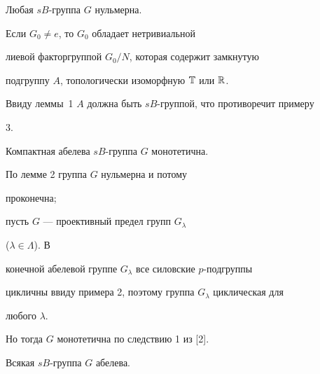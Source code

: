  


\begin{lem} 


Любая $sB$-группа $G$ нульмерна. 


\end{lem} 


 


\begin{pf} 


Если $G_0\ne e$, то $G_0$ обладает нетривиальной 


лиевой факторгруппой $G_0/N$, которая содержит замкнутую 


подгруппу $A$, топологически изоморфную $\Bbb T$ или $\Bbb R$.  


Ввиду леммы~1\; $A$ должна быть $sB$-группой, что противоречит примеру 


3. 


\end{pf} 


 


\begin{lem} 


Компактная абелева $sB$-группа $G$ монотетична. 


\end{lem} 


 


\begin{pf} По лемме 2 группа $G$ нульмерна и потому 


проконечна; 


пусть $G$ --- проективный предел групп $G_\lambda$ 


($\lambda\in\Lambda$). В 


конечной абелевой группе $G_\lambda$ все силовские $p$-подгруппы 


цикличны ввиду примера 2, поэтому группа $G_\lambda$ циклическая для 


любого $\lambda$. 


Но тогда $G$ монотетична по следствию 1 из [2]. 


\end{pf} 


 


\begin{lem} 


Всякая $sB$-группа $G$ абелева.  


\end{lem}


